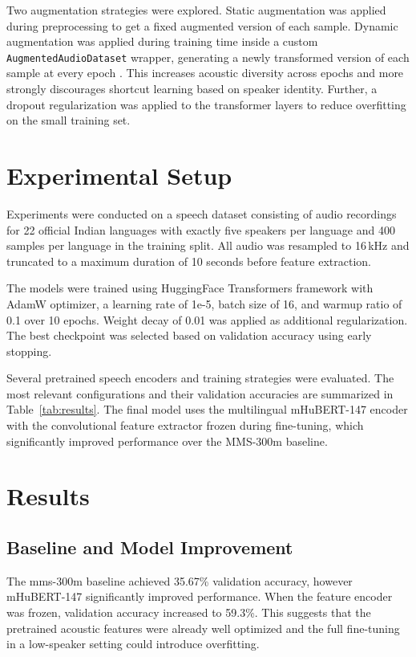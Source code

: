 \documentclass[11pt]{article}
\begin{document}
Two augmentation strategies were explored. Static augmentation was applied during preprocessing to get a fixed augmented version of each 
sample. Dynamic augmentation was applied during training time inside a custom 
\texttt{AugmentedAudioDataset} wrapper, generating a newly transformed 
version of each sample at every epoch \cite{cubuk2019randaugment}. This 
increases acoustic diversity across epochs and more strongly discourages 
shortcut learning based on speaker identity. Further, a dropout 
regularization was applied to the transformer layers to reduce 
overfitting on the small training set.


\section{Experimental Setup}
Experiments were conducted on a speech dataset consisting of audio 
recordings for 22 official Indian languages with exactly five speakers 
per language and 400 samples per language in the training split. All 
audio was resampled to 16\,kHz and truncated to a maximum duration of 
10 seconds before feature extraction.

The models were trained using HuggingFace Transformers framework 
\cite{wolf2020transformers} with AdamW optimizer, a learning rate 
of \mbox{1e-5}, batch size of 16, and warmup ratio of 0.1 over 10 
epochs. Weight decay of 0.01 was applied as additional regularization. 
The best checkpoint was selected based on validation accuracy using 
early stopping.

Several pretrained speech encoders and training strategies were 
evaluated. The most relevant configurations and their validation 
accuracies are summarized in Table~\ref{tab:results}. The final model 
uses the multilingual mHuBERT-147 encoder \cite{boito2024mhubert147compactmultilingualhubert} with 
the convolutional feature extractor frozen during fine-tuning, which 
significantly improved performance over the MMS-300m baseline.


\section{Results}

\subsection{Baseline and Model Improvement}
The mms-300m baseline achieved 35.67\% validation accuracy, however mHuBERT-147 significantly improved performance. When the feature encoder was frozen, validation accuracy increased to 59.3\%. This suggests that the pretrained acoustic features were already well optimized and the full fine-tuning in a low-speaker setting could introduce overfitting.
\end{document}
